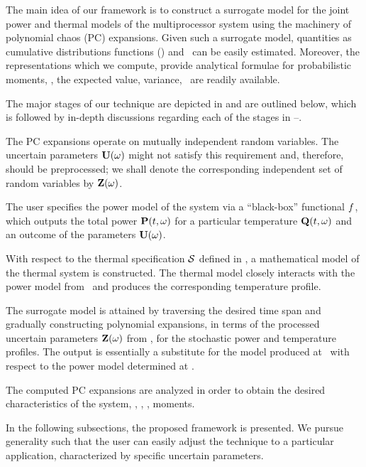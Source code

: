 
The main idea of our framework is to construct a surrogate model for the joint power and thermal models of the multiprocessor system using the machinery of polynomial chaos (PC) expansions.
Given such a surrogate model, quantities as cumulative distributions functions (\cdfs) and \pdfs\ can be easily estimated. Moreover, the representations which we compute, provide analytical formulae for probabilistic moments, \ie, the expected value, variance, \etc\ are readily available.

The major stages of our technique are depicted in  and are outlined below, which is followed by in-depth discussions regarding each of the stages in --.

 The PC expansions operate on mutually independent random variables. The uncertain parameters $\mathbf{U}(\omega)$ might not satisfy this requirement and, therefore, should be preprocessed; we shall denote the corresponding independent set of random variables by $\mathbf{Z}(\omega)$.

 The user specifies the power model of the system via a ``black-box'' functional $f$, which outputs the total power $\mathbf{P}(t, \omega)$ for a particular temperature $\mathbf{Q}(t, \omega)$ and an outcome of the parameters $\mathbf{U}(\omega)$.

 With respect to the thermal specification $\mathcal{S}$ defined in , a mathematical model of the thermal system is constructed. The thermal model closely interacts with the power model from \ and produces the corresponding temperature profile.

 The surrogate model is attained by traversing the desired time span and gradually constructing polynomial expansions, in terms of the processed uncertain parameters $\mathbf{Z}(\omega)$ from , for the stochastic power and temperature profiles. The output is essentially a substitute for the model produced at \ with respect to the power model determined at .

 The computed PC expansions are analyzed in order to obtain the desired characteristics of the system, \eg, \cdfs, \pdfs, moments.

In the following subsections, the proposed framework is presented. We pursue generality such that the user can easily adjust the technique to a particular application, characterized by specific uncertain parameters.

